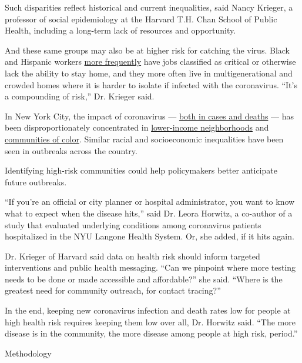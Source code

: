 Such disparities reflect historical and current inequalities, said Nancy
Krieger, a professor of social epidemiology at the Harvard T.H. Chan
School of Public Health, including a long-term lack of resources and
opportunity.

And these same groups may also be at higher risk for catching the virus.
Black and Hispanic workers
\href{https://www.cdc.gov/coronavirus/2019-ncov/need-extra-precautions/racial-ethnic-minorities.html}{more
frequently} have jobs classified as critical or otherwise lack the
ability to stay home, and they more often live in multigenerational and
crowded homes where it is harder to isolate if infected with the
coronavirus. ``It's a compounding of risk,'' Dr. Krieger said.

In New York City, the impact of coronavirus ---
\href{https://www1.nyc.gov/assets/doh/downloads/pdf/imm/covid-19-deaths-race-ethnicity-05142020-1.pdf}{both
in cases and deaths} --- has been disproportionately concentrated in
\href{https://time.com/5821212/coronavirus-low-income-communities/}{lower-income
neighborhoods} and
\href{https://www1.nyc.gov/assets/doh/downloads/pdf/imm/covid-19-deaths-race-ethnicity-04082020-1.pdf}{communities
of color}. Similar racial and socioeconomic inequalities have been seen
in outbreaks across the country.

Identifying high-risk communities could help policymakers better
anticipate future outbreaks.

``If you're an official or city planner or hospital administrator, you
want to know what to expect when the disease hits,'' said Dr. Leora
Horwitz, a co-author of a study that evaluated underlying conditions
among coronavirus patients hospitalized in the NYU Langone Health
System. Or, she added, if it hits again.

Dr. Krieger of Harvard said data on health risk should inform targeted
interventions and public health messaging. ``Can we pinpoint where more
testing needs to be done or made accessible and affordable?'' she said.
``Where is the greatest need for community outreach, for contact
tracing?''

In the end, keeping new coronavirus infection and death rates low for
people at high health risk requires keeping them low over all, Dr.
Horwitz said. ``The more disease is in the community, the more disease
among people at high risk, period.''

Methodology

